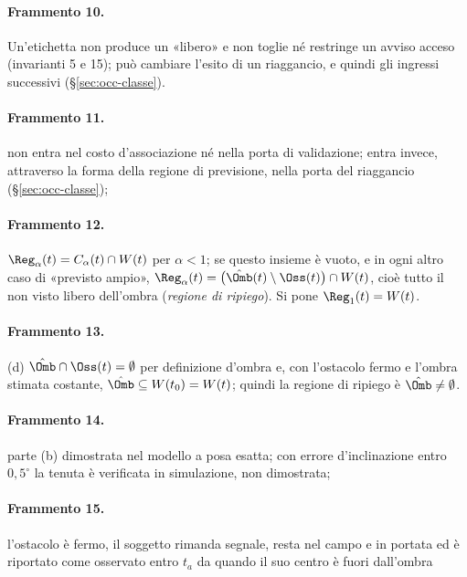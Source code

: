 \paragraph{Frammento 10.}
Un'etichetta non produce un «libero» e non toglie né restringe un avviso acceso (invarianti 5 e 15); può cambiare l'esito di un riaggancio, e quindi gli ingressi successivi (\S\ref{sec:occ-classe}).

\paragraph{Frammento 11.}
non entra nel costo d'associazione né nella porta di validazione; entra invece, attraverso la forma della regione di previsione, nella porta del riaggancio (\S\ref{sec:occ-classe});

\paragraph{Frammento 12.}
$\Reg_\alpha(t)=C_\alpha(t)\cap W(t)$ per $\alpha<1$; se questo insieme è vuoto, e in ogni altro caso di «previsto ampio», $\Reg_\alpha(t)=\bigl(\hat\Omb(t)\setminus\Oss(t)\bigr)\cap W(t)$, cioè tutto il non visto libero dell'ombra (\emph{regione di ripiego}). Si pone $\Reg_1(t)=W(t)$.

\paragraph{Frammento 13.}
(d) $\hat\Omb\cap\Oss(t)=\emptyset$ per definizione d'ombra e, con l'ostacolo fermo e l'ombra stimata costante, $\hat\Omb\subseteq W(t_0)=W(t)$; quindi la regione di ripiego è $\hat\Omb\neq\emptyset$.

\paragraph{Frammento 14.}
parte (b) dimostrata nel modello a posa esatta; con errore d'inclinazione entro $0{,}5^\circ$ la tenuta è verificata in simulazione, non dimostrata;

\paragraph{Frammento 15.}
l'ostacolo è fermo, il soggetto rimanda segnale, resta nel campo e in portata ed è riportato come osservato entro $t_a$ da quando il suo centro è fuori dall'ombra

